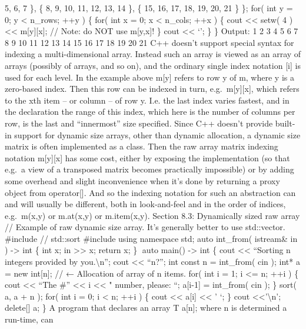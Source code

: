 5, 6, 7 \}, \{ 8, 9, 10, 11, 12, 13, 14 \}, \{ 15, 16, 17, 18, 19, 20,
21 \} \}; for( int y = 0; y \textless{} n\_rows; ++y ) \{ for( int x =
0; x \textless{} n\_cols; ++x ) \{ cout \textless\textless{} setw( 4 )
\textless\textless{} m{[}y{]}{[}x{]}; // Note: do NOT use m{[}y,x{]}! \}
cout \textless\textless{} `\n'; \} \} Output: 1 2 3 4 5 6 7 8 9 10 11 12
13 14 15 16 17 18 19 20 21 C++ doesn't support special syntax for
indexing a multi-dimensional array. Instead such an array is viewed as
an array of arrays (possibly of arrays, and so on), and the ordinary
single index notation {[}i{]} is used for each level. In the example
above m{[}y{]} refers to row y of m, where y is a zero-based index. Then
this row can be indexed in turn, e.g.~m{[}y{]}{[}x{]}, which refers to
the xth item -- or column -- of row y. I.e. the last index varies
fastest, and in the declaration the range of this index, which here is
the number of columns per row, is the last and ``innermost'' size
specified. Since C++ doesn't provide built-in support for dynamic size
arrays, other than dynamic allocation, a dynamic size matrix is often
implemented as a class. Then the raw array matrix indexing notation
m{[}y{]}{[}x{]} has some cost, either by exposing the implementation (so
that e.g.~a view of a transposed matrix becomes practically impossible)
or by adding some overhead and slight inconvenience when it's done by
returning a proxy object from operator{[}{]}. And so the indexing
notation for such an abstraction can and will usually be different, both
in look-and-feel and in the order of indices, e.g.~m(x,y) or m.at(x,y)
or m.item(x,y). Section 8.3: Dynamically sized raw array // Example of
raw dynamic size array. It's generally better to use std::vector.
\#include // std::sort \#include using namespace std; auto int\_from(
istream\& in ) -\textgreater{} int \{ int x; in
\textgreater\textgreater{} x; return x; \} auto main() -\textgreater{}
int \{ cout \textless\textless{} ``Sorting n integers provided by
you.\textbackslash n''; cout \textless\textless{} ``n?''; int const n =
int\_from( cin ); int* a = new int{[}n{]}; // ← Allocation of array of n
items. for( int i = 1; i \textless= n; ++i ) \{ cout
\textless\textless{} ``The \#'' \textless\textless{} i
\textless\textless{} " number, please: ``; a{[}i-1{]} = int\_from( cin
); \} sort( a, a + n ); for( int i = 0; i \textless{} n; ++i ) \{ cout
\textless\textless{} a{[}i{]} \textless\textless{} ' `; \} cout
\textless\textless{}'\textbackslash n'; delete{[}{]} a; \} A program
that declares an array T a{[}n{]}; where n is determined a run-time, can
